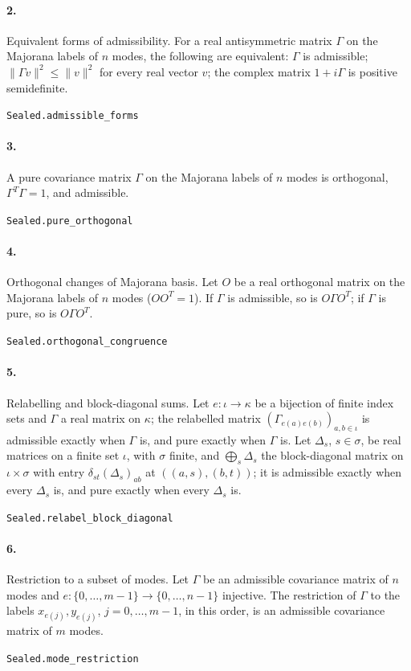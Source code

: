 \documentclass[11pt]{article}
\begin{document}
\paragraph{2.} Equivalent forms of admissibility. For a real antisymmetric matrix $\Gamma$ on the Majorana labels of $n$ modes, the following are equivalent: $\Gamma$ is admissible; $\|\Gamma v\|^2 \le \|v\|^2$ for every real vector $v$; the complex matrix $1 + i\Gamma$ is positive semidefinite.\par{\footnotesize\texttt{Sealed.admissible\_forms}}

\paragraph{3.} A pure covariance matrix $\Gamma$ on the Majorana labels of $n$ modes is orthogonal, $\Gamma^T \Gamma = 1$, and admissible.\par{\footnotesize\texttt{Sealed.pure\_orthogonal}}

\paragraph{4.} Orthogonal changes of Majorana basis. Let $O$ be a real orthogonal matrix on the Majorana labels of $n$ modes ($O O^T = 1$). If $\Gamma$ is admissible, so is $O \Gamma O^T$; if $\Gamma$ is pure, so is $O \Gamma O^T$.\par{\footnotesize\texttt{Sealed.orthogonal\_congruence}}

\paragraph{5.} Relabelling and block-diagonal sums. Let $e : \iota \to \kappa$ be a bijection of finite index sets and $\Gamma$ a real matrix on $\kappa$; the relabelled matrix $(\Gamma_{e(a) e(b)})_{a, b \in \iota}$ is admissible exactly when $\Gamma$ is, and pure exactly when $\Gamma$ is. Let $\Delta_s$, $s \in \sigma$, be real matrices on a finite set $\iota$, with $\sigma$ finite, and $\bigoplus_s \Delta_s$ the block-diagonal matrix on $\iota \times \sigma$ with entry $\delta_{st} (\Delta_s)_{ab}$ at $((a, s), (b, t))$; it is admissible exactly when every $\Delta_s$ is, and pure exactly when every $\Delta_s$ is.\par{\footnotesize\texttt{Sealed.relabel\_block\_diagonal}}

\paragraph{6.} Restriction to a subset of modes. Let $\Gamma$ be an admissible covariance matrix of $n$ modes and $e : \{0, \dots, m - 1\} \to \{0, \dots, n - 1\}$ injective. The restriction of $\Gamma$ to the labels $x_{e(j)}, y_{e(j)}$, $j = 0, \dots, m - 1$, in this order, is an admissible covariance matrix of $m$ modes.\par{\footnotesize\texttt{Sealed.mode\_restriction}}
\end{document}

